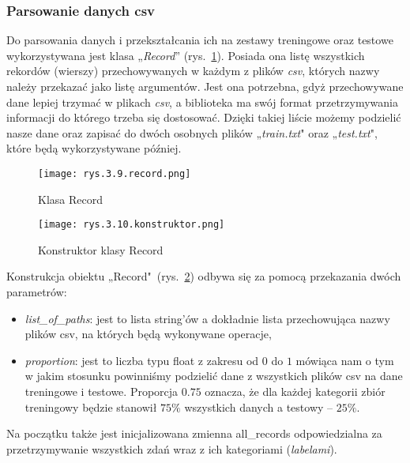\subsubsection{Parsowanie danych csv}
\label{sec:3.2.2.1}

Do parsowania danych i przekształcania ich na zestawy treningowe oraz testowe wykorzystywana jest klasa „\emph{Record}” (rys.~\ref{fig:3.9}). Posiada ona listę wszystkich rekordów (wierszy) przechowywanych w każdym z plików \emph{csv}, których nazwy należy przekazać jako listę argumentów. Jest ona potrzebna, gdyż przechowywane dane lepiej trzymać w plikach \emph{csv}, a biblioteka ma swój format przetrzymywania informacji do którego trzeba się dostosować. Dzięki takiej liście możemy podzielić nasze dane oraz zapisać do dwóch osobnych plików „\emph{train.txt}" oraz „\emph{test.txt}", które będą wykorzystywane później.
\begin{figure}[h]
    \centering
    \texttt{[image: rys.3.9.record.png]}
    \caption{Klasa Record}
    \label{fig:3.9}
\end{figure}

\begin{figure}[h]
    \centering
    \texttt{[image: rys.3.10.konstruktor.png]}
    \caption{Konstruktor klasy Record}
    \label{fig:3.10}
\end{figure}

Konstrukcja obiektu „Record"~(rys.~\ref{fig:3.10}) odbywa się za pomocą przekazania dwóch parametrów:
\begin{itemize}[label=\textbullet]
\item \emph{list\_of\_paths}: jest to lista string’ów a dokładnie lista przechowująca nazwy plików csv, na których będą wykonywane operacje,
\item \emph{proportion}: jest to liczba typu float z zakresu od $0$ do $1$ mówiąca nam o tym w jakim stosunku powinniśmy podzielić dane z wszystkich plików csv na dane treningowe i testowe. Proporcja $0.75$ oznacza, że dla każdej kategorii zbiór treningowy będzie stanowił $75\%$ wszystkich danych a testowy – $25\%$.
\end{itemize}
Na początku także jest inicjalizowana zmienna all\_records odpowiedzialna za przetrzymywanie wszystkich zdań wraz z ich kategoriami (\emph{labelami}).

